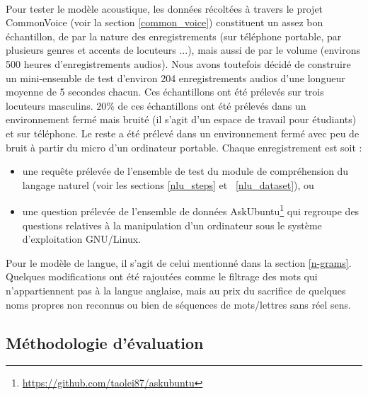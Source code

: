 	\paragraph{}
	Pour tester le modèle acoustique, les données récoltées à travers le projet CommonVoice (voir la section \ref{common_voice}) constituent un assez bon échantillon, de par la nature des enregistrements (sur téléphone portable, par plusieurs genres et accents de locuteurs ...), mais aussi de par le volume (environs 500 heures d'enregistrements audios). Nous avons toutefois décidé de construire un mini-ensemble de test d'environ 204 enregistrements audios d'une longueur moyenne de 5 secondes chacun. Ces échantillons ont été prélevés sur trois locuteurs masculins. $20\%$ de ces échantillons ont été prélevés dans un environnement fermé mais bruité (il s'agit d'un espace de travail pour étudiants) et sur téléphone. Le reste a été prélevé dans un environnement fermé avec peu de bruit à partir du micro d'un ordinateur portable. Chaque enregistrement est soit : 
	\begin{itemize}
		\item une requête prélevée de l'ensemble de test du module de compréhension du langage naturel (voir les sections \ref{nlu_steps} et ~\ref{nlu_dataset}), ou
		
		\item une question prélevée de l'ensemble de données AskUbuntu\footnote{\url{https://github.com/taolei87/askubuntu}} qui regroupe des questions relatives à la manipulation d'un ordinateur sous le système d'exploitation GNU/Linux.
	\end{itemize}
	\par
	Pour le modèle de langue, il s'agit de celui mentionné dans la section 
	\ref{n-grams}. Quelques modifications ont été rajoutées comme le filtrage des mots qui n'appartiennent pas à la langue anglaise, mais au prix du sacrifice de quelques noms propres non reconnus ou bien de séquences de mots/lettres sans réel sens.
	\subsection{Méthodologie d'évaluation}
